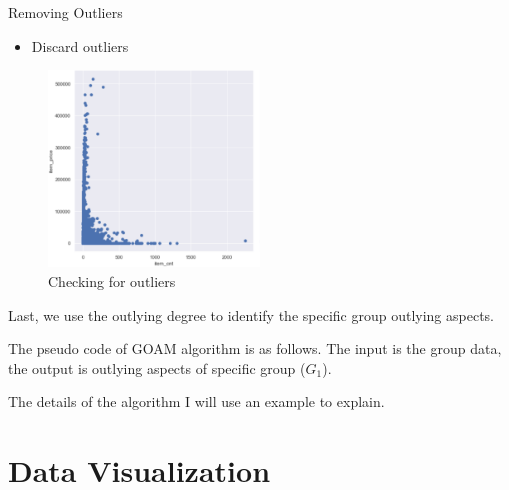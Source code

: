 \documentclass[
 size=14pt,
 paper=smartboard,  %
 mode=present, 		%
 display=slides, 	%
 style=tuliplab,  	%
 pauseslide,
 fleqn,leqno]{powerdot}
\begin{document}
\begin{slide}{Removing Outliers}
  \begin{itemize}
    \item
    Discard outliers
    
    \end{itemize}
    
    \begin{figure}
      \centering
      \includegraphics[width=0.5\textwidth,natwidth=780,natheight=703]{figures/outliers.eps}
      \caption{Checking for outliers}\label{Checking for outliers}
    \end{figure}
    
    \begin{note}
    Last,
    we use the outlying degree to identify the specific group outlying aspects.
    
    The pseudo code of GOAM algorithm is as follows.
    The input is the group data,
    the output is outlying aspects of specific group ($G_1$).
    
    The details of the algorithm I will use an example to explain.
    \end{note}

\end{slide}



\section{Data Visualization}
\end{document}
